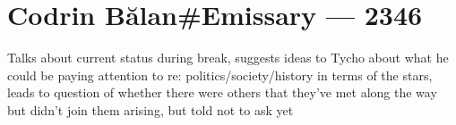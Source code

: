 \hypertarget{codrin-bux103lanemissary-2346}{%
\chapter{Codrin Bălan\#Emissary — 2346}\label{codrin-bux103lanemissary-2346}}

Talks about current status during break, suggests ideas to Tycho about what he could be paying attention to re: politics/society/history in terms of the stars, leads to question of whether there were others that they've met along the way but didn't join them arising, but told not to ask yet

